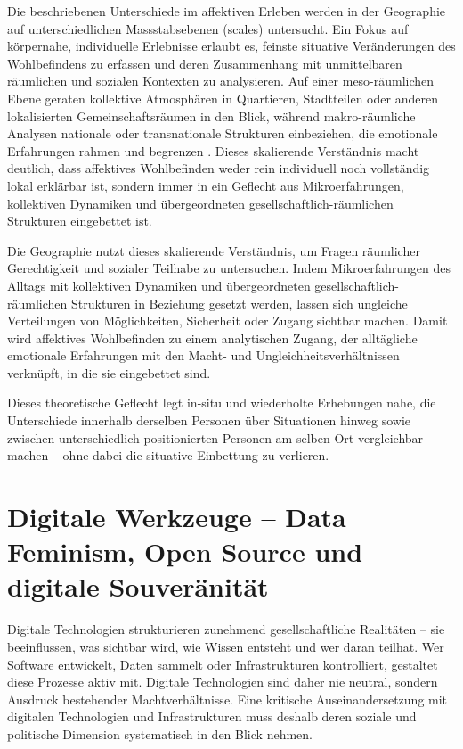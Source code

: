 Die beschriebenen Unterschiede im affektiven Erleben werden in der Geographie auf unterschiedlichen Massstabsebenen (scales) untersucht. Ein Fokus auf körpernahe, individuelle Erlebnisse erlaubt es, feinste situative Veränderungen des Wohlbefindens zu erfassen und deren Zusammenhang mit unmittelbaren räumlichen und sozialen Kontexten zu analysieren. Auf einer meso-räumlichen Ebene geraten kollektive Atmosphären in Quartieren, Stadtteilen oder anderen lokalisierten Gemeinschaftsräumen in den Blick, während makro-räumliche Analysen nationale oder transnationale Strukturen einbeziehen, die emotionale Erfahrungen rahmen und begrenzen \parencite{howittScaleRelationMusical1998,marstonHumanGeographyScale2005}. Dieses skalierende Verständnis macht deutlich, dass affektives Wohlbefinden weder rein individuell noch vollständig lokal erklärbar ist, sondern immer in ein Geflecht aus Mikroerfahrungen, kollektiven Dynamiken und übergeordneten gesellschaftlich-räumlichen Strukturen eingebettet ist.

Die Geographie nutzt dieses skalierende Verständnis, um Fragen räumlicher Gerechtigkeit und sozialer Teilhabe zu untersuchen. Indem Mikroerfahrungen des Alltags mit kollektiven Dynamiken und übergeordneten gesellschaftlich-räumlichen Strukturen in Beziehung gesetzt werden, lassen sich ungleiche Verteilungen von Möglichkeiten, Sicherheit oder Zugang sichtbar machen. Damit wird affektives Wohlbefinden zu einem analytischen Zugang, der alltägliche emotionale Erfahrungen mit den Macht- und Ungleichheitsverhältnissen verknüpft, in die sie eingebettet sind.

Dieses theoretische Geflecht legt in-situ und wiederholte Erhebungen nahe, die Unterschiede innerhalb derselben Personen über Situationen hinweg sowie zwischen unterschiedlich positionierten Personen am selben Ort vergleichbar machen -- ohne dabei die situative Einbettung zu verlieren.

\section{Digitale Werkzeuge -- Data Feminism, Open Source und digitale Souveränität}
\label{sec:datafeminism}

Digitale Technologien strukturieren zunehmend gesellschaftliche Realitäten -- sie beeinflussen, was sichtbar wird, wie Wissen entsteht und wer daran teilhat. Wer Software entwickelt, Daten sammelt oder Infrastrukturen kontrolliert, gestaltet diese Prozesse aktiv mit. Digitale Technologien sind daher nie neutral, sondern Ausdruck bestehender Machtverhältnisse. Eine kritische Auseinandersetzung mit digitalen Technologien und Infrastrukturen muss deshalb deren soziale und politische Dimension systematisch in den Blick nehmen.

